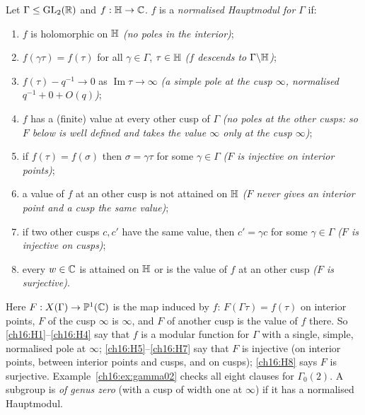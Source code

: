 \begin{definition}\label{ch16:def:hauptmodul}
Let $\Gamma\le\mathrm{GL}_2(\mathbb{R})$ and $f:\mathbb{H}\to{\mathbb{C}}$.  $f$ is a \emph{normalised Hauptmodul for $\Gamma$} if:
\begin{enumerate}[label=(H\arabic*)]
\item\label{ch16:H1} $f$ is holomorphic on $\mathbb{H}$ \emph{(no poles in the interior)};
\item\label{ch16:H2} $f(\gamma\tau)=f(\tau)$ for all $\gamma\in\Gamma$, $\tau\in\mathbb{H}$ \emph{($f$ descends to
  $\Gamma\backslash\mathbb{H}$)};
\item\label{ch16:H3} $f(\tau)-q^{-1}\to0$ as $\operatorname{Im}\tau\to\infty$ \emph{(a simple pole at the cusp $\infty$,
  normalised $q^{-1}+0+O(q)$)};
\item\label{ch16:H4} $f$ has a (finite) value at every other cusp of $\Gamma$ \emph{(no poles at the other cusps:
  so $F$ below is well defined and takes the value $\infty$ only at the cusp $\infty$)};
\item\label{ch16:H5} if $f(\tau)=f(\sigma)$ then $\sigma=\gamma\tau$ for some $\gamma\in\Gamma$ \emph{($F$ is injective
  on interior points)};
\item\label{ch16:H6} a value of $f$ at an other cusp is not attained on $\mathbb{H}$ \emph{($F$ never gives an
  interior point and a cusp the same value)};
\item\label{ch16:H7} if two other cusps $c,c'$ have the same value, then $c'=\gamma c$ for some $\gamma\in\Gamma$
  \emph{($F$ is injective on cusps)};
\item\label{ch16:H8} every $w\in{\mathbb{C}}$ is attained on $\mathbb{H}$ or is the value of $f$ at an other cusp \emph{($F$
  is surjective)}.
\end{enumerate}
Here $F:X(\Gamma)\to\mathbb{P}^1({\mathbb{C}})$ is the map induced by $f$: $F(\Gamma\tau)=f(\tau)$ on interior points, $F$ of the
cusp $\infty$ is $\infty$, and $F$ of another cusp is the value of $f$ there.  So \ref{ch16:H1}--\ref{ch16:H4} say that
$f$ is a modular function for $\Gamma$ with a single, simple, normalised pole at $\infty$; \ref{ch16:H5}--\ref{ch16:H7}
say that $F$ is injective (on interior points, between interior points and cusps, and on cusps); \ref{ch16:H8} says $F$
is surjective.  Example~\ref{ch16:ex:gamma02} checks all eight clauses for $\Gamma_0(2)$.
A subgroup is \emph{of genus zero} (with a cusp of width one at $\infty$) if it has a normalised Hauptmodul.
\end{definition}
